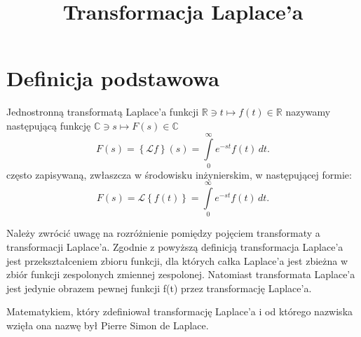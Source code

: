 \documentclass{article}
\begin{document}
\title{Transformacja Laplace'a}
\maketitle
\section*{Definicja podstawowa}
Jednostronną transformatą Laplace’a funkcji $ \mathbb{R} \ni t \mapsto f(t) \in \mathbb{R} $ nazywamy następującą funkcję \( \mathbb{C} \ni s \mapsto F(s) \in \mathbb{C} \)
$$ F(s) = \left\{\mathcal{L} f\right\}(s) = \int\limits_0^\infty e^{-st} f(t)\, dt. $$
często zapisywaną, zwłaszcza w środowisku inżynierskim, w następującej formie: 
\[ F(s) = \mathcal{L} \left\{f(t)\right\} = \int\limits_0^\infty e^{-st} f(t)\, dt. \]

Należy zwrócić uwagę na rozróżnienie pomiędzy pojęciem transformaty a transformacji Laplace’a. Zgodnie z powyższą definicją transformacja Laplace’a jest przekształceniem zbioru funkcji, dla których całka Laplace’a jest zbieżna w zbiór funkcji zespolonych zmiennej zespolonej. Natomiast transformata Laplace’a jest jedynie obrazem pewnej funkcji f(t) przez transformację Laplace’a.

Matematykiem, który zdefiniował transformację Laplace’a i od którego nazwiska wzięła ona nazwę był Pierre Simon de Laplace. 
\end{document}
